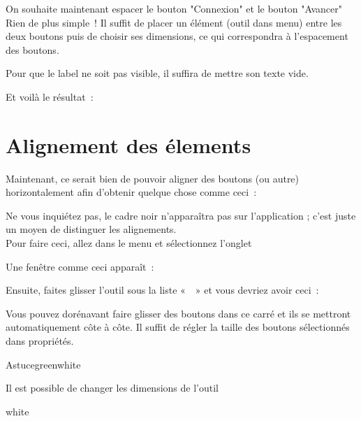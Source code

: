 On souhaite maintenant espacer le bouton "Connexion" et le bouton "Avancer" \\

Rien de plus simple ! Il suffit de placer un élément 
(outil dans menu) entre les deux boutons puis de
choisir ses dimensions, ce qui correspondra à l'espacement des boutons. \\

Pour que le label ne soit pas visible, il suffira de mettre son texte vide.


Et voilà le résultat : 



\section{Alignement des élements}

Maintenant, ce serait bien de pouvoir aligner des boutons (ou autre)
horizontalement afin d'obtenir quelque  chose comme ceci :


Ne vous inquiétez pas, le cadre noir n’apparaîtra pas sur l'application ; c'est juste un moyen de distinguer les alignements. \\

Pour faire ceci, allez dans le {\color{orange} menu} et sélectionnez l'onglet 


Une fenêtre comme ceci apparaît :


Ensuite, faites glisser l'outil 
sous la liste «  » et vous devriez avoir ceci :


Vous pouvez dorénavant faire glisser des boutons dans ce carré et ils se mettront automatiquement côte à côte. Il suffit de régler la taille des boutons sélectionnés dans {\color{green}propriétés}.


\begin{messageBox}{Astuce}{green}{white}{

Il est possible de changer les dimensions de l'outil 
}{white}
\end{messageBox}


